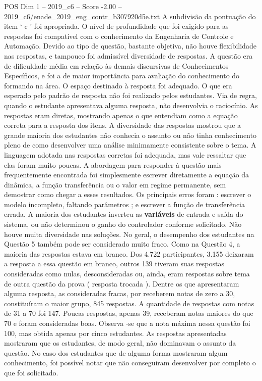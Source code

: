 \begin{textsample}{POS Dim 1 – 2019\_c6 – Score -2.00 – 2019\_c6/enade\_2019\_eng\_contr\_b307920d5e.txt}
A subdivisão da pontuação do item ‘ c ’ foi apropriada.
O nível de profundidade que foi exigido para as respostas foi compatível com o conhecimento da Engenharia de Controle e Automação.
Devido ao tipo de questão, bastante objetiva, não houve flexibilidade nas respostas, e tampouco foi admissível diversidade de respostas.
A questão era de dificuldade média em relação às demais discursivas de Conhecimentos Específicos, e foi a de maior importância para avaliação do conhecimento do formando na área.
O espaço destinado à resposta foi adequado.
O que era esperado pelo padrão de resposta não foi realizado pelos estudantes.
Via de regra, quando o estudante apresentava alguma resposta, não desenvolvia o raciocínio.
As respostas eram diretas, mostrando apenas o que entendiam como a equação correta para a resposta dos itens.
A diversidade das respostas mostrou que a grande maioria dos estudantes não conhecia o assunto ou não tinha conhecimento pleno de como desenvolver uma análise minimamente consistente sobre o tema.
A linguagem adotada nas respostas corretas foi adequada, mas vale ressaltar que elas foram muito poucas.
A abordagem para responder à questão mais frequentemente encontrada foi simplesmente escrever diretamente a equação da dinâmica, a função transferência ou o valor em regime permanente, sem demostrar como chegar a esses resultados.
Os principais erros foram : escrever o modelo incompleto, faltando parâmetros ; e escrever a função de transferência errada.
A maioria dos estudantes inverteu as \textbf{variáveis} de entrada e saída do sistema, ou não determinou o ganho do controlador conforme solicitado.
Não houve muita diversidade nas soluções.
No geral, o desempenho dos estudantes na Questão 5 também pode ser considerado muito fraco.
Como na Questão 4, a maioria das respostas estava em branco.
Dos 4.722 participantes, 3.155 deixaram a resposta a essa questão em branco, outros 139 tiveram suas respostas consideradas como nulas, desconsideradas ou, ainda, eram respostas sobre tema de outra questão da prova ( resposta trocada ).
Dentre os que apresentaram alguma resposta, as consideradas fracas, por receberem notas de zero a 30, constituíram o maior grupo, 845 respostas.
A quantidade de respostas com notas de 31 a 70 foi 147.
Poucas respostas, apenas 39, receberam notas maiores do que 70 e foram consideradas boas.
Observa -se que a nota máxima nessa questão foi 100, mas obtida apenas por cinco estudantes.
As respostas apresentadas mostraram que os estudantes, de modo geral, não dominavam o assunto da questão.
No caso dos estudantes que de alguma forma mostraram algum conhecimento, foi possível notar que não conseguiram desenvolver por completo o que foi solicitado.

\end{textsample}
